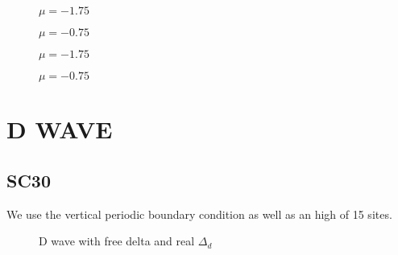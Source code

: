 \documentclass[../main.tex]{subfiles}
\begin{document}
\begin{figure}[H]
    
    \caption{$\mu = -1.75$}
\end{figure}
\begin{figure}[H]
    
    \caption{$\mu = -0.75$}
\end{figure}

\begin{figure}[H]
    
    \caption{$\mu = -1.75$}
\end{figure}
\begin{figure}[H]
    
    \caption{$\mu = -0.75$}
\end{figure}

\section{D WAVE}

\subsection{SC30}
We use the vertical periodic boundary condition as well as an high of 15 sites.
\begin{figure}[H]
    
    \caption{D wave with free delta and real $\Delta_d$}
\end{figure}
\end{document}
